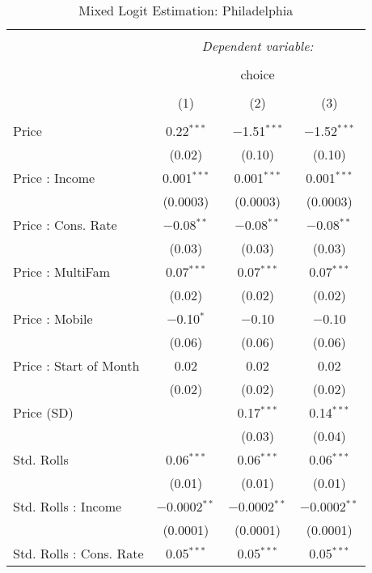 
\begin{table}[!htbp] \centering 
  \caption{Mixed Logit Estimation: Philadelphia} 
  \label{tab:mnlPhiladelphiaRandCoef} 
\begin{tabular}{@{\extracolsep{5pt}}lccc} 
\\[-1.8ex]\hline 
\hline \\[-1.8ex] 
 & \multicolumn{3}{c}{\textit{Dependent variable:}} \\ 
\cline{2-4} 
\\[-1.8ex] & \multicolumn{3}{c}{choice} \\ 
\\[-1.8ex] & (1) & (2) & (3)\\ 
\hline \\[-1.8ex] 
 Price & 0.22$^{***}$ & $-$1.51$^{***}$ & $-$1.52$^{***}$ \\ 
  & (0.02) & (0.10) & (0.10) \\ 
  Price : Income & 0.001$^{***}$ & 0.001$^{***}$ & 0.001$^{***}$ \\ 
  & (0.0003) & (0.0003) & (0.0003) \\ 
  Price : Cons. Rate & $-$0.08$^{**}$ & $-$0.08$^{**}$ & $-$0.08$^{**}$ \\ 
  & (0.03) & (0.03) & (0.03) \\ 
  Price : MultiFam & 0.07$^{***}$ & 0.07$^{***}$ & 0.07$^{***}$ \\ 
  & (0.02) & (0.02) & (0.02) \\ 
  Price : Mobile & $-$0.10$^{*}$ & $-$0.10 & $-$0.10 \\ 
  & (0.06) & (0.06) & (0.06) \\ 
  Price : Start of Month & 0.02 & 0.02 & 0.02 \\ 
  & (0.02) & (0.02) & (0.02) \\ 
  Price (SD) &  & 0.17$^{***}$ & 0.14$^{***}$ \\ 
  &  & (0.03) & (0.04) \\ 
  Std. Rolls & 0.06$^{***}$ & 0.06$^{***}$ & 0.06$^{***}$ \\ 
  & (0.01) & (0.01) & (0.01) \\ 
  Std. Rolls : Income & $-$0.0002$^{**}$ & $-$0.0002$^{**}$ & $-$0.0002$^{**}$ \\ 
  & (0.0001) & (0.0001) & (0.0001) \\ 
  Std. Rolls : Cons. Rate & 0.05$^{***}$ & 0.05$^{***}$ & 0.05$^{***}$ \\ 

\end{tabular}
\end{table}
